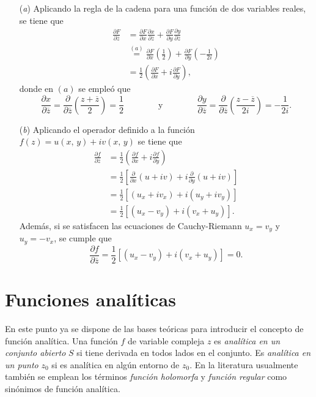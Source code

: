 \documentclass[a4paper]{report}
\begin{document}
\begin{enumerate}
 \item[(\textit{a})] Aplicando la regla de la cadena para una función de dos variables reales, se tiene que 
 \begin{align*}
  \frac{\partial F}{\partial\overline{z}}&=
  \frac{\partial F}{\partial x}\frac{\partial x}{\partial\overline{z}}+\frac{\partial F}{\partial y}\frac{\partial y}{\partial\overline{z}}\\
   &\overset{(a)}{=}\frac{\partial F}{\partial x}\left(\frac{1}{2}\right)+\frac{\partial F}{\partial y}\left(-\frac{1}{2i}\right)\\
   &=\frac{1}{2}\left(\frac{\partial F}{\partial x}+i\frac{\partial F}{\partial y}\right),
 \end{align*}
 donde en \((a)\) se empleó que 
 \[
  \frac{\partial x}{\partial\overline{z}}=\frac{\partial}{\partial\overline{z}}\left(\frac{z+\overline{z}}{2}\right)=\frac{1}{2}
  \qquad\qquad\textrm{y}\qquad\qquad
  \frac{\partial y}{\partial\overline{z}}=\frac{\partial}{\partial\overline{z}}\left(\frac{z-\overline{z}}{2i}\right)=-\frac{1}{2i}.
 \]
 \item[(\textit{b})] Aplicando el operador definido a la función \(f(z)=u(x,\,y)+iv(x,\,y)\) se tiene que 
 \begin{align*}
  \frac{\partial f}{\partial\overline{z}}&=\frac{1}{2}\left(\frac{\partial f}{\partial x}+i\frac{\partial f}{\partial y}\right)\\
  &=\frac{1}{2}\left[\frac{\partial}{\partial x}(u+iv)+i\frac{\partial}{\partial y}(u+iv)\right]\\
  &=\frac{1}{2}\left[(u_x+iv_x)+i(u_y+iv_y)\right]\\
  &=\frac{1}{2}\left[(u_x-v_y)+i(v_x+u_y)\right].
 \end{align*}
 Además, si se satisfacen las ecuaciones de Cauchy-Riemann \(u_x=v_y\) y \(u_y=-v_x\), se cumple que 
 \[
  \frac{\partial f}{\partial\overline{z}}=\frac{1}{2}\left[(u_x-v_y)+i(v_x+u_y)\right]=0.
 \]
\end{enumerate}

\section{Funciones analíticas}\label{sec:analytic_functions}

En este punto ya se dispone de las bases teóricas para introducir el concepto de función analítica. Una función \(f\) de variable compleja \(z\) es \emph{analítica en un conjunto abierto} \(S\) si tiene derivada en todos lados en el conjunto. Es \emph{analítica en un punto} \(z_0\) si es analítica en algún entorno de \(z_0\). En la literatura usualmente también se emplean los términos \emph{función holomorfa} y \emph{función regular} como sinónimos de función analítica.
\end{document}
